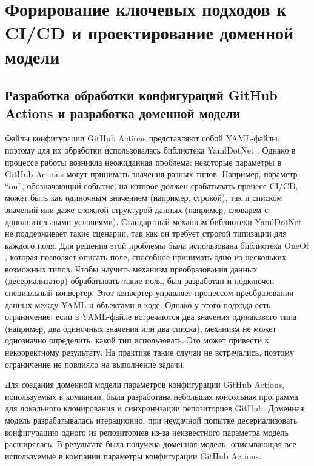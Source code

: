 \chapter{Форирование ключевых подходов к CI/CD и проектирование доменной модели} \label{ch:ch2}

\section{Разработка обработки конфигураций GitHub Actions и разработка доменной модели}
Файлы конфигурации GitHub Actions представляют собой YAML-файлы, поэтому для их обработки использовалась библиотека YamlDotNet \cite{yamldotnet}.
Однако в процессе работы возникла неожиданная проблема: некоторые параметры в GitHub Actions могут принимать значения разных типов.
Например, параметр \enquote{on}, обозначающий событие, на которое должен срабатывать процесс CI/CD, может быть как одиночным значением (например, строкой), так и списком значений или даже сложной структурой данных (например, словарем с дополнительными условиями).
Стандартный механизм библиотеки YamlDotNet не поддерживает такие сценарии,
так как он требует строгой типизации для каждого поля.
Для решения этой проблемы была использована библиотека OneOf \cite{oneof},
которая позволяет описать поле, способное принимать одно из нескольких возможных типов.
Чтобы научить механизм преобразования данных (десериализатор) обрабатывать такие поля, был разработан и подключен специальный конвертер.
Этот конвертер управляет процессом преобразования данных между YAML и объектами в коде.
Однако у этого подхода есть ограничение: если в YAML-файле встречаются два значения одинакового типа (например, два одиночных значения или два списка),
механизм не может однозначно определить, какой тип использовать.
Это может привести к некорректному результату.
На практике такие случаи не встречались, поэтому ограничение не повлияло на выполнение задачи.

Для создания доменной модели параметров конфигурации GitHub Actions, используемых в компании, была разработана небольшая консольная программа для локального клонирования и синхронизации репозиториев GitHub.
Доменная модель разрабатывалась итерационно: при неудачной попытке десериализовать конфигурацию одного из репозиториев из-за неизвестного параметра модель расширялась.
В результате была получена доменная модель, описывающая все используемые в компании параметры конфигурации GitHub Actions.

